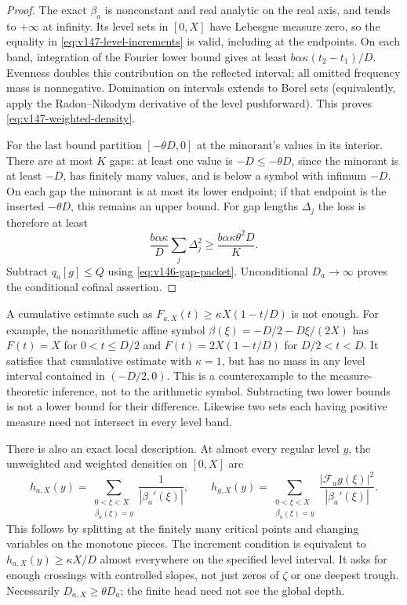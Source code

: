 \documentclass[11pt]{article}
\theoremstyle{remark}
\begin{document}
\begin{proof}
The exact $\beta_a$ is nonconstant and real analytic on the real axis,
and tends to $+\infty$ at infinity. Its level sets in $[0,X]$ have
Lebesgue measure zero, so the equality in
\eqref{eq:v147-level-increments} is valid, including at the endpoints.
On each band, integration of the Fourier lower bound gives at least
$b\alpha\kappa(t_2-t_1)/D$. Evenness doubles this contribution on the
reflected interval; all omitted frequency mass is nonnegative.
Domination on intervals extends to Borel sets (equivalently, apply the
Radon--Nikodym derivative of the level pushforward). This proves
\eqref{eq:v147-weighted-density}.

For the last bound partition $[-\theta D,0]$ at the minorant's values
in its interior. There are at most $K$ gaps: at least one value is
$-D\le-\theta D$, since the minorant is at least $-D$, has finitely
many values, and is below a symbol with infimum $-D$. On each gap the
minorant is at most its lower endpoint; if that endpoint is the
inserted $-\theta D$, this remains an upper bound. For gap lengths
$\Delta_j$ the loss is therefore at least
\[
 \frac{b\alpha\kappa}{D}\sum_j\Delta_j^2
 \ge\frac{b\alpha\kappa\theta^2D}{K}.
\]
Subtract $q_a[g]\le Q$ using \eqref{eq:v146-gap-packet}.
Unconditional $D_a\to\infty$ proves the conditional cofinal assertion.
\end{proof}

A cumulative estimate such as
$F_{a,X}(t)\ge\kappa X(1-t/D)$ is not enough. For example, the
nonarithmetic affine symbol $\beta(\xi)=-D/2-D\xi/(2X)$ has
$F(t)=X$ for $0<t\le D/2$ and $F(t)=2X(1-t/D)$ for $D/2<t<D$.
It satisfies that cumulative estimate with $\kappa=1$, but has no
mass in any level interval contained in $(-D/2,0)$. This is a
counterexample to the measure-theoretic inference, not to the
arithmetic symbol. Subtracting two lower bounds is not a lower bound
for their difference. Likewise two sets each having positive measure
need not intersect in every level band.

There is also an exact local description. At almost every regular level
$y$, the unweighted and weighted densities on $[0,X]$ are
\begin{equation}\label{eq:v147-coarea}
 h_{a,X}(y)=\sum_{\substack{0<\xi<X\\\beta_a(\xi)=y}}
          \frac1{|\beta_a'(\xi)|},\qquad
 h_{g,X}(y)=\sum_{\substack{0<\xi<X\\\beta_a(\xi)=y}}
          \frac{|\mathcal F_ag(\xi)|^2}{|\beta_a'(\xi)|}.
\end{equation}
This follows by splitting at the finitely many critical points and
changing variables on the monotone pieces. The increment condition is
equivalent to $h_{a,X}(y)\ge\kappa X/D$ almost everywhere on the
specified level interval. It asks for enough crossings with controlled
slopes, not just zeros of $\zeta$ or one deepest trough. Necessarily
$D_{a,X}\ge\theta D_a$; the finite head need not see the global depth.
\end{document}

